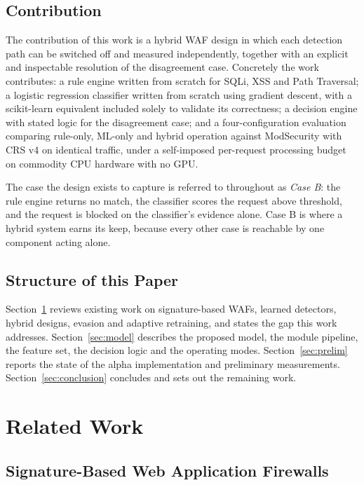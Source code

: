 \documentclass[runningheads]{llncs}
\begin{document}
\subsection{Contribution}

The contribution of this work is a hybrid WAF design in which each
detection path can be switched off and measured independently, together
with an explicit and inspectable resolution of the disagreement case.
Concretely the work contributes: a rule engine written from scratch for
SQLi, XSS and Path Traversal; a logistic regression classifier written
from scratch using gradient descent, with a scikit-learn equivalent
included solely to validate its correctness; a decision engine with
stated logic for the disagreement case; and a four-configuration
evaluation comparing rule-only, ML-only and hybrid operation against
ModSecurity with CRS v4 on identical traffic, under a self-imposed
per-request processing budget on commodity CPU hardware with no GPU.

The case the design exists to capture is referred to throughout as
\emph{Case B}: the rule engine returns no match, the classifier scores
the request above threshold, and the request is blocked on the
classifier's evidence alone. Case B is where a hybrid system earns its
keep, because every other case is reachable by one component acting
alone.

\subsection{Structure of this Paper}

Section~\ref{sec:related} reviews existing work on signature-based
WAFs, learned detectors, hybrid designs, evasion and adaptive
retraining, and states the gap this work addresses.
Section~\ref{sec:model} describes the proposed model, the module
pipeline, the feature set, the decision logic and the operating modes.
Section~\ref{sec:prelim} reports the state of the alpha implementation
and preliminary measurements. Section~\ref{sec:conclusion} concludes
and sets out the remaining work.

\section{Related Work}
\label{sec:related}

\subsection{Signature-Based Web Application Firewalls}
\end{document}
